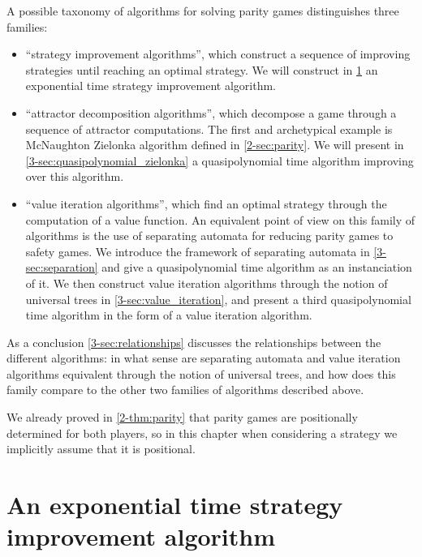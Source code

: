 

A possible taxonomy of algorithms for solving parity games distinguishes three families:
\begin{itemize}
	\item ``strategy improvement algorithms'', which construct a sequence of improving strategies until reaching an optimal strategy. 
	We will construct in \cref{3-sec:strategy_improvement} an exponential time strategy improvement algorithm.
	
	\item ``attractor decomposition algorithms'', which decompose a game through a sequence of attractor computations. 
	The first and archetypical example is McNaughton Zielonka algorithm defined in \cref{2-sec:parity}. 
	We will present in \cref{3-sec:quasipolynomial_zielonka} a quasipolynomial time algorithm improving over this algorithm.

	\item ``value iteration algorithms'', which find an optimal strategy through the computation of a value function.
	An equivalent point of view on this family of algorithms is the use of separating automata for reducing parity games to safety games.
	We introduce the framework of separating automata in \cref{3-sec:separation} and give a quasipolynomial time algorithm as an instanciation of it. 
	We then construct value iteration algorithms through the notion of universal trees in \cref{3-sec:value_iteration},
	and present a third quasipolynomial time algorithm in the form of a value iteration algorithm.
\end{itemize}

As a conclusion \cref{3-sec:relationships} discusses the relationships between the different algorithms: in what sense are separating automata and value iteration algorithms equivalent through the notion of universal trees, and how does this family compare to the other two families of algorithms described above.

\begin{remark}
We already proved in \cref{2-thm:parity} that parity games are positionally determined for both players, so in this chapter when considering a strategy we implicitly assume that it is positional.
\end{remark}


\section{An exponential time strategy improvement algorithm}
\label{3-sec:strategy_improvement}


